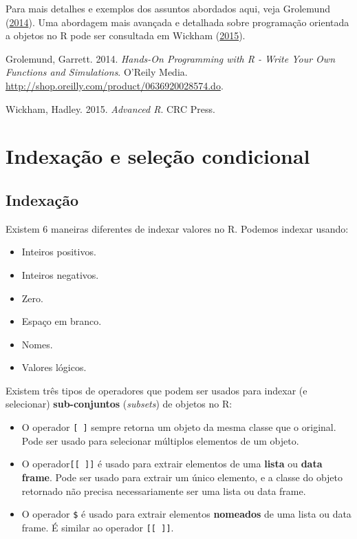 \documentclass[
  10pt,
  a4paper]{book}
\providecommand{\tightlist}{%
  \setlength{\itemsep}{0pt}\setlength{\parskip}{0pt}}
\newlength{\cslhangindent}
\newlength{\cslentryspacingunit} %
\newenvironment{CSLReferences}[2] %
 {%
  \setlength{\parindent}{0pt}
  \ifodd #1
  \let\oldpar\par
  \def\par{\hangindent=\cslhangindent\oldpar}
  \fi
  \setlength{\parskip}{#2\cslentryspacingunit}
 }%
 {}
\begin{document}
Para mais detalhes e exemplos dos assuntos abordados aqui, veja
Grolemund (\protect\hyperlink{ref-Grolemund2014}{2014}). Uma abordagem mais avançada e detalhada sobre
programação orientada a objetos no R pode ser consultada em
Wickham (\protect\hyperlink{ref-Wickham2015}{2015}).

\hypertarget{refs}{}
\begin{CSLReferences}{1}{0}
\leavevmode{}%
Grolemund, Garrett. 2014. \emph{{Hands-On Programming with R - Write Your Own Functions and Simulations}}. O'Reily Media. \url{http://shop.oreilly.com/product/0636920028574.do}.

\leavevmode{}%
Wickham, Hadley. 2015. \emph{{Advanced R}}. CRC Press.

\end{CSLReferences}

\hypertarget{indexauxe7uxe3o-e-seleuxe7uxe3o-condicional}{%
\chapter{Indexação e seleção condicional}\label{indexauxe7uxe3o-e-seleuxe7uxe3o-condicional}}

\hypertarget{indexauxe7uxe3o}{%
\section{Indexação}\label{indexauxe7uxe3o}}

Existem 6 maneiras diferentes de indexar valores no R. Podemos indexar
usando:

\begin{itemize}
\tightlist
\item
  Inteiros positivos.
\item
  Inteiros negativos.
\item
  Zero.
\item
  Espaço em branco.
\item
  Nomes.
\item
  Valores lógicos.
\end{itemize}

Existem três tipos de operadores que podem ser usados para indexar (e
selecionar) \textbf{sub-conjuntos} (\emph{subsets}) de objetos no R:

\begin{itemize}
\tightlist
\item
  O operador \texttt{{[}\ {]}} sempre retorna um objeto da mesma classe que o
  original. Pode ser usado para selecionar múltiplos elementos de um
  objeto.
\item
  O operador\texttt{{[}{[}\ {]}{]}} é usado para extrair elementos de uma \textbf{lista} ou
  \textbf{data frame}. Pode ser usado para extrair um único elemento, e a
  classe do objeto retornado não precisa necessariamente ser uma lista
  ou data frame.
\item
  O operador \texttt{\$} é usado para extrair elementos \textbf{nomeados} de uma
  lista ou data frame. É similar ao operador \texttt{{[}{[}\ {]}{]}}.
\end{itemize}
\end{document}
